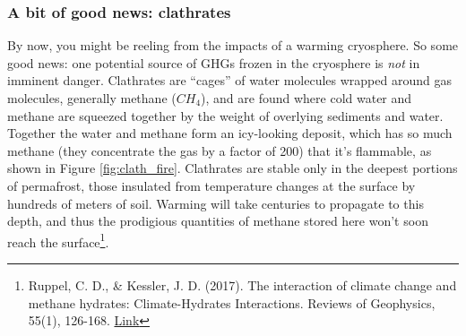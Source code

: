 
\subsubsection{A bit of good news: clathrates} By now, you might be reeling from the impacts of a warming cryosphere. So some good news: one potential source of GHGs frozen in the cryosphere is \emph{not} in imminent danger. Clathrates are ``cages'' of water molecules wrapped around gas molecules, generally methane ($CH_4$), and are found where cold water and methane are squeezed together by the weight of overlying sediments and water. Together the water and methane form an icy-looking deposit, which has so much methane (they concentrate the gas by a factor of 200) that it's flammable, as shown in Figure \ref{fig:clath_fire}. Clathrates are stable only in the deepest portions of permafrost, those insulated from temperature changes at the surface by hundreds of meters of soil. Warming will take centuries to propagate to this depth, and thus the prodigious quantities of methane stored here won't soon reach the surface\footnote{Ruppel, C. D., \& Kessler, J. D. (2017). The interaction of climate change and methane hydrates: Climate-Hydrates Interactions. Reviews of Geophysics, 55(1), 126-168. \href{https://doi.org/10.1002/2016RG000534}{Link}}.   

